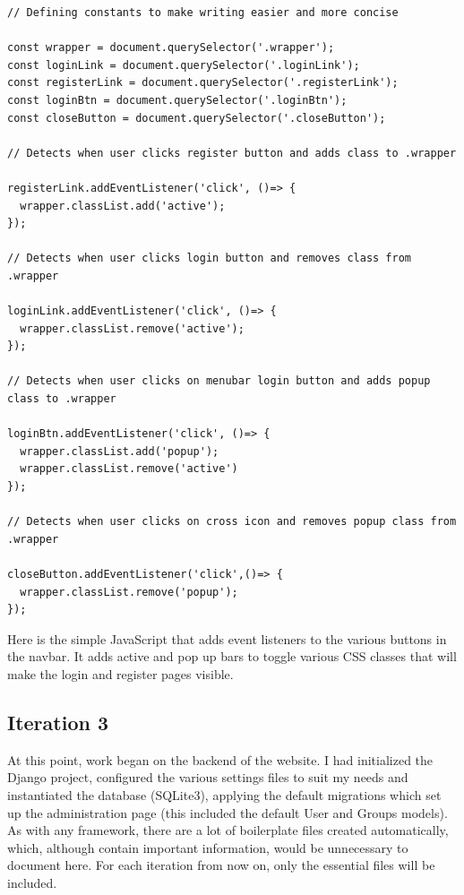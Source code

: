 \documentclass{article}
\begin{document}
\begin{lstlisting}[caption={app.js}]
  // Defining constants to make writing easier and more concise

const wrapper = document.querySelector('.wrapper');
const loginLink = document.querySelector('.loginLink');
const registerLink = document.querySelector('.registerLink');
const loginBtn = document.querySelector('.loginBtn');
const closeButton = document.querySelector('.closeButton');

// Detects when user clicks register button and adds class to .wrapper 

registerLink.addEventListener('click', ()=> {
  wrapper.classList.add('active');
});

// Detects when user clicks login button and removes class from .wrapper

loginLink.addEventListener('click', ()=> {
  wrapper.classList.remove('active');
});

// Detects when user clicks on menubar login button and adds popup class to .wrapper

loginBtn.addEventListener('click', ()=> {
  wrapper.classList.add('popup');
  wrapper.classList.remove('active')
});

// Detects when user clicks on cross icon and removes popup class from .wrapper

closeButton.addEventListener('click',()=> {
  wrapper.classList.remove('popup');
});
\end{lstlisting}

Here is the simple JavaScript that adds event listeners to the various buttons in the navbar. It adds active and pop up bars to toggle various CSS classes that will make the login and register pages visible.

\subsection{Iteration 3}

At this point, work began on the backend of the website. I had initialized the Django project, configured the various settings files to suit my needs and instantiated the database (SQLite3), applying the default migrations which set up the administration page (this included the default User and Groups models). As with any framework, there are a lot of boilerplate files created automatically, which, although contain important information, would be unnecessary to document here. For each iteration from now on, only the essential files will be included. 
\end{document}
